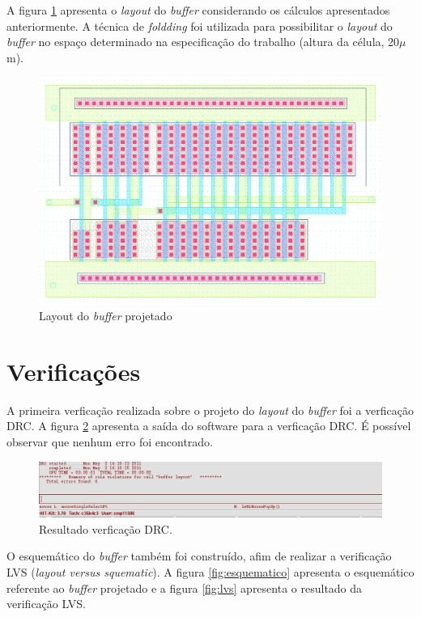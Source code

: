 \documentclass[a4paper,10pt] {article}
\begin{document}
A figura \ref{fig:buffer} apresenta o \textit{layout} do \textit{buffer} considerando os cálculos apresentados anteriormente. A técnica de \textit{foldding} foi utilizada para possibilitar o \textit{layout} do \textit{buffer} no espaço determinado na especificação do trabalho (altura da célula, 20$\mu$m).

\begin{figure} [h]
	\centering
	\includegraphics[scale=0.25]{layout_buffer.png}
	\caption{Layout do \textit{buffer} projetado}
	\label{fig:buffer}
\end{figure}

\section{Verificações}
\label{sec:veri}
A primeira verficação realizada sobre o projeto do \textit{layout} do \textit{buffer} foi a verficação DRC. A figura \ref{fig:drc} apresenta a saída do software para a verficação DRC. É possível observar que nenhum erro foi encontrado.

\begin{figure} [h]
	\centering
	\includegraphics[scale=0.4]{DRC_buffer.png}
	\caption{Resultado verficação DRC.}
	\label{fig:drc}
\end{figure}

O esquemático do \textit{buffer} também foi construído, afim de realizar a verificação LVS (\textit{layout versus squematic}). A figura \ref{fig:esquematico} apresenta o esquemático referente ao \textit{buffer} projetado e a figura \ref{fig:lvs} apresenta o resultado da verificação LVS.
\end{document}
